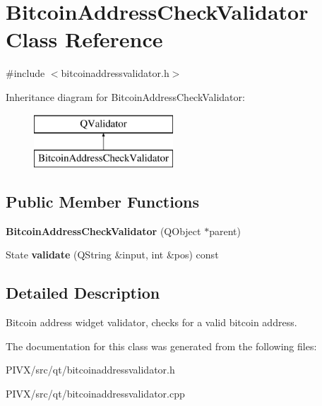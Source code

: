 \hypertarget{class_bitcoin_address_check_validator}{}\section{Bitcoin\+Address\+Check\+Validator Class Reference}
\label{class_bitcoin_address_check_validator}


{\ttfamily \#include $<$bitcoinaddressvalidator.\+h$>$}

Inheritance diagram for Bitcoin\+Address\+Check\+Validator\+:\begin{figure}[H]
\begin{center}
\leavevmode
\includegraphics[height=2.000000cm]{class_bitcoin_address_check_validator}
\end{center}
\end{figure}
\subsection*{Public Member Functions}
\begin{DoxyCompactItemize}
\item 
\mbox{\label{class_bitcoin_address_check_validator_ad546bb34a6980e73f9896f89cdfe6699}} 
{\bfseries Bitcoin\+Address\+Check\+Validator} (Q\+Object $\ast$parent)
\item 
\mbox{\label{class_bitcoin_address_check_validator_a9f1a2f3d85862d0ecf65749d1fa697d1}} 
State {\bfseries validate} (Q\+String \&input, int \&pos) const
\end{DoxyCompactItemize}


\subsection{Detailed Description}
Bitcoin address widget validator, checks for a valid bitcoin address. 

The documentation for this class was generated from the following files\+:\begin{DoxyCompactItemize}
\item 
P\+I\+V\+X/src/qt/bitcoinaddressvalidator.\+h\item 
P\+I\+V\+X/src/qt/bitcoinaddressvalidator.\+cpp\end{DoxyCompactItemize}
